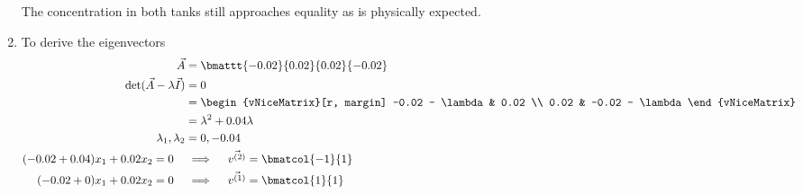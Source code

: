 \begin{enumerate}
\begin{figure}[H]
              \centering
          \end{figure}
          The concentration in both tanks still approaches equality as is physically
          expected.

    \item To derive the eigenvectors
          \begin{align}
              \vec{A}                         & = \bmattt{-0.02}{0.02}{0.02}{-0.02} \\
              \det(\vec{A} - \lambda \vec{I}) & = 0                                 \\
                                              & =
              \begin{vNiceMatrix}[r, margin]
                  -0.02 - \lambda & 0.02            \\
                  0.02            & -0.02 - \lambda
              \end{vNiceMatrix}                                     \\
                                              & = \lambda^{2} + 0.04\lambda         \\
              \lambda_1, \lambda_2            & = 0, -0.04                          \\
              (-0.02 + 0.04)x_1 + 0.02 x_2 = 0 \quad
                                              & \implies
              \quad \vec{v^{(2)}} = \bmatcol{-1}{1}                                 \\
              (-0.02 + 0)x_1 + 0.02 x_2 = 0 \quad
                                              & \implies
              \quad \vec{v^{(1)}} = \bmatcol{1}{1}
          \end{align}


\end{enumerate}
